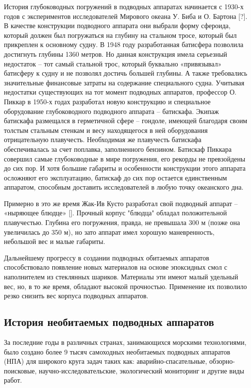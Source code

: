 История глубоководных погружений в подводных аппаратах начинается с 1930-х годов с экспериментов исследователей Мирового океана У. Биба и О. Бартона [?]. В качестве конструкции подводного аппарата они выбрали форму сфероида, который должен был погружаться на глубину на стальном тросе, который был прикреплен к основному судну. В 1948 году разработанная батисфера позволила достигнуть глубины 1360 метров. Но данная конструкция имела серьезный недостаток – тот самый стальной трос, который буквально «привязывал» батисферу к судну и не позволял достичь большей глубины. А также требовались значительные финансовые затраты на содержание специального судна.
Учитывая недостатки существующих на тот момент подводных аппаратов, профессор О. Пиккар в 1950-х годах разработал новую конструкцию и специальное оборудование глубоководного подводного аппарата – батискафа. Экипаж батискафа размещался в герметичной сфере – гондоле, имеющей благодаря своим толстым стальным стенкам и весу находящегося в ней оборудования отрицательную плавучесть. Необходимая же плавучесть батискафа обеспечивалась за счет поплавка, заполненного бензином. Батискаф Пиккара совершил самые глубоководные в мире погружения, его рекорды не превзойдены до сих пор. И хотя большие габариты и особенности конструкции этого аппарата осложняют его эксплуатацию, батискаф до сих пор остается единственным аппаратом, способным доставить исследователей в любую точку океанского дна.

Примерно в это же время Жак-Ив Кусто разработал свой подводный аппарат – «ныряющее блюдце» []. Прочный корпус "блюдца" обладал положительной плавучестью. Глубина его погружения, правда, не превышала 300 м (позже она увеличилась до 350 м), но зато аппарат имел хорошую маневренность, небольшой вес и малые габариты.

Дальнейшему прогрессу в создании подводных обитаемых аппаратов способствовало появление новых материалов на основе эпоксидных смол с наполнителем из стеклянных шариков. Материалы эти имеют малый удельный вес, но, в то же время, обладают высокой прочностью. Применение их позволило резко снизить вес корпуса подводных аппаратов.

\subsection{История необитаемых подводных аппаратов}\label{subsec:ch1/sec21/sub2}

За последние годы в различных странах, занимающихся морскими технологиями, было создано более 9 тысяч самоходных необитаемых подводных аппаратов (НПА) для широкого круга задач таких как: аварийно-спасательные, обзорно-поисковые, научно-исследовательские, экологический мониторинг и другие виды работ.

